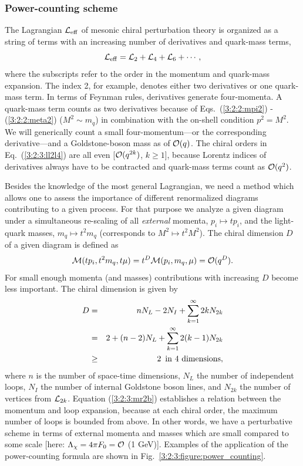 \documentclass[twoside,12pt]{article}
\begin{document}
\subsubsection{Power-counting scheme}
   The Lagrangian ${\cal L}_{\rm eff}$ of mesonic chiral perturbation theory is
organized as a string of terms with an increasing number of derivatives and
quark-mass terms,
\begin{equation}
\label{3:2:3:ll2l4}
{\cal L}_{\rm eff}={\cal L}_2 + {\cal L}_4 + {\cal L}_6 +\cdots,
\end{equation}
where the subscripts refer to the order in the momentum and quark-mass expansion.
   The index 2, for example, denotes either two derivatives or one quark-mass term.
   In terms of Feynman rules, derivatives generate four-momenta.
   A quark-mass term counts as two derivatives because of Eqs.\
(\ref{3:2:2:mpi2}) - (\ref{3:2:2:meta2}) ($M^2\sim m_q$) in combination with the
on-shell condition $p^2=M^2$.
   We will generically count a small four-momentum---or the corresponding
derivative---and a Goldstone-boson mass as of ${\cal O}(q)$.
   The chiral orders in Eq.\ (\ref{3:2:3:ll2l4}) are all even [${\cal O}(q^{2k})$,
$k\geq 1$], because Lorentz indices of derivatives always have to be
contracted and quark-mass terms count as ${\cal O}(q^2)$.

   Besides the knowledge of the most general Lagrangian, we need a method which
allows one to assess the importance of different renormalized diagrams contributing
to a given process.
   For that purpose we analyze a given diagram under a simultaneous re-scaling of
all {\em external} momenta, $p_i\mapsto t p_i$, and
the light-quark masses, $m_q\mapsto t^2 m_q$ (corresponds to $M^2\mapsto t^2 M^2$).
   The chiral dimension $D$ of a given diagram is defined as
\begin{equation}
\label{3:2:3:mr1} {\cal M}(tp_i, t^2 m_q,t\mu)=t^D {\cal M}(p_i,m_q,\mu)={\cal
O}(q^D).
\end{equation}
  For small enough momenta (and masses) contributions
with increasing $D$ become less important.
   The chiral dimension is given by
\begin{eqnarray}
\label{3:2:3:mr2a} D&=&n N_L-2N_I+\sum_{k=1}^\infty 2k N_{2k}\\&=&
2+(n-2)N_L+\sum_{k=1}^\infty 2(k-1)N_{2k} \label{3:2:3:mr2b}
\\
&\geq&2\,\,\,{\rm in\,\, 4\,\, dimensions,}\nonumber
\end{eqnarray}
where $n$ is the number of space-time dimensions,
$N_L$ the number of independent loops,
$N_I$ the number of internal Goldstone boson lines, and
$N_{2k}$ the number of vertices from ${\cal L}_{2k}$.
   Equation (\ref{3:2:3:mr2b}) establishes a relation
between the momentum and loop expansion, because at each chiral
order, the maximum number of loops is bounded from above.
   In other words, we have a perturbative scheme in terms of external momenta
and masses which are small compared to some scale
[here: $\Lambda_\chi=4\pi F_0={\cal O}$ (1 GeV)].
   Examples of the application of the power-counting formula are shown in
Fig.\ \ref{3:2:3:figure:power_counting}.
\end{document}
